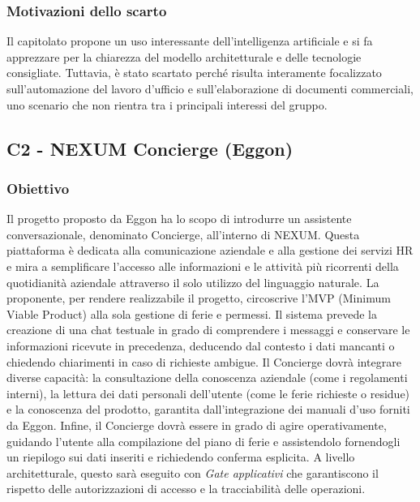 \documentclass[11pt, a4paper]{article}
\begin{document}
\subsubsection{Motivazioni dello scarto}
Il capitolato propone un uso interessante dell'intelligenza artificiale e si fa apprezzare per la chiarezza del modello architetturale e delle tecnologie consigliate. Tuttavia, è stato scartato perché risulta interamente focalizzato sull'automazione del lavoro d'ufficio e sull'elaborazione di documenti commerciali, uno scenario che non rientra tra i principali interessi del gruppo.

\subsection{C2 - NEXUM Concierge (Eggon)}

\subsubsection{Obiettivo}
Il progetto proposto da Eggon ha lo scopo di introdurre un assistente conversazionale, denominato Concierge, all'interno di NEXUM. Questa piattaforma è dedicata alla comunicazione aziendale e alla gestione dei servizi HR e mira a semplificare l'accesso alle informazioni e le attività più ricorrenti della quotidianità aziendale attraverso il solo utilizzo del linguaggio naturale. La proponente, per rendere realizzabile il progetto, circoscrive l'MVP (Minimum Viable Product) alla sola gestione di ferie e permessi. \newline
Il sistema prevede la creazione di una chat testuale in grado di comprendere i messaggi e conservare le informazioni ricevute in precedenza, deducendo dal contesto i dati mancanti o chiedendo chiarimenti in caso di richieste ambigue. Il Concierge dovrà integrare diverse capacità: la consultazione della conoscenza aziendale (come i regolamenti interni), la lettura dei dati personali dell'utente (come le ferie richieste o residue) e la conoscenza del prodotto, garantita dall'integrazione dei manuali d'uso forniti da Eggon. \newline
Infine, il Concierge dovrà essere in grado di agire operativamente, guidando l'utente alla compilazione del piano di ferie e assistendolo fornendogli un riepilogo sui dati inseriti e richiedendo conferma esplicita. A livello architetturale, questo sarà eseguito con \textit{Gate applicativi} che garantiscono il rispetto delle autorizzazioni di accesso e la tracciabilità delle operazioni.
\end{document}
